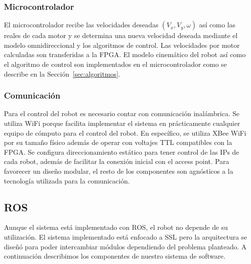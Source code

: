 \documentclass[twocolumn,10pt]{amrob}
\begin{document}
\subsubsection*{Microcontrolador}
\label{sec:micro}
El microcontrolador recibe las velocidades deseadas $(V_x,V_y,\omega)$ así como las reales de cada motor y se determina una nueva velocidad deseada mediante el modelo omnidireccional y los algoritmos de control. Las velocidades por motor calculadas son transferidas a la FPGA. El modelo cinemático del robot así como el algoritmo de control son implementados en el microcontrolador como se describe en la Sección~\ref{sec:algoritmos}.

\subsubsection*{Comunicación}
\label{sec:comunicaciones}
Para el control del robot es necesario contar con comunicación inalámbrica. Se utiliza WiFi porque facilita implementar el sistema en prácticamente cualquier equipo de cómputo para el control del robot. En específico, se utiliza XBee WiFi por su tamaño físico además de operar con voltajes TTL compatibles con la FPGA. Se configura direccionamiento estático para tener control de las IPs de cada robot, además de facilitar la conexión inicial con el access point. Para favorecer un diseño modular, el resto de los componentes son agnósticos a la tecnología utilizada para la comunicación. \par %

\subsection{ROS}
Aunque el sistema está implementado con ROS, el robot no depende de su utilización. El sistema implementado está enfocado a SSL pero la arquitectura se diseñó para poder intercambiar módulos dependiendo del problema planteado. A continuación describimos los componentes de nuestro sistema de software.
\end{document}
